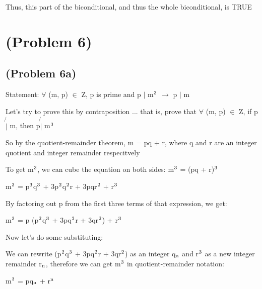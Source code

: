 \documentclass{article}
\begin{document}
\par\vspace{0.5cm}\noindent Thus, this part of the biconditional, and thus the whole biconditional, is TRUE

\section{(Problem 6)}

\subsection{(Problem 6a)}
Statement: $\forall$ (m, p) $\in$ Z, p is prime and p $\mid$ m$\textsuperscript{3}$ $\rightarrow$ p $\mid$ m

\par\vspace{0.5cm}\noindent Let's try to prove this by contraposition ... that is, prove that $\forall$ (m, p) $\in$ Z, if p $\not{|}$ m, then p$\not{|}$ m$\textsuperscript{3}$

\par\vspace{0.5cm}\noindent So by the quotient-remainder theorem, m = pq + r, where q and r are an integer quotient and integer remainder respecitvely

\par\vspace{0.5cm}\noindent To get m$\textsuperscript{3}$, we can cube the equation on both sides: m$\textsuperscript{3}$ = (pq + r)$\textsuperscript{3}$

\par\vspace{0.5cm}\noindent m$\textsuperscript{3}$ = p$\textsuperscript{3}$q$\textsuperscript{3}$ + 3p$\textsuperscript{2}$q$\textsuperscript{2}$r + 3pqr$\textsuperscript{2}$ + r$\textsuperscript{3}$

\par\vspace{0.5cm}\noindent By factoring out p from the first three terms of that expression, we get: \par\noindent
m$\textsuperscript{3}$ = p (p$\textsuperscript{2}$q$\textsuperscript{3}$ + 3pq$\textsuperscript{2}$r + 3qr$\textsuperscript{2}$) + r$\textsuperscript{3}$

\par\vspace{0.5cm}\noindent Now let's do some substituting: \par\noindent
We can rewrite (p$\textsuperscript{2}$q$\textsuperscript{3}$ + 3pq$\textsuperscript{2}$r + 3qr$\textsuperscript{2}$) as an integer q$\textsubscript{n}$ and r$\textsuperscript{3}$ as a new integer remainder r$\textsubscript{n}$, therefore we can get m$\textsuperscript{3}$ in quotient-remainder notation: \par\noindent m$\textsuperscript{3}$ = pq$\textsubscript{n}$ + r$\textsuperscript{n}$
\end{document}
